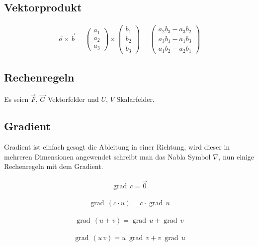 \documentclass[a4paper]{scrartcl}
\begin{document}
\subsection{Vektorprodukt}
\begin{align}
 \vec{a}\times\vec{b} = \begin{pmatrix}a_1 \\ a_2 \\ a_3\end{pmatrix} \times
\begin{pmatrix}b_1 \\ b_2 \\ b_3 \end{pmatrix} = \begin{pmatrix} a_2b_3 - a_3b_2
\\ a_3b_1 - a_1b_3 \\ a_1b_2 - a_2b_1 \end{pmatrix}
\end{align}

\subsection{Rechenregeln}
Es seien $\vec F$, $\vec G$ Vektorfelder und $U$, $V$ Skalarfelder.


\subsection{Gradient}

Gradient ist einfach gesagt die Ableitung in einer Richtung, wird dieser in mehreren Dimensionen angewendet schreibt man das Nabla Symbol $ \nabla $, nun einige Rechenregeln mit dem Gradient.

\begin{align}
\operatorname{grad}\,c=\vec{0}
\end{align}

\begin{align}
\operatorname{grad}\,(c\cdot u)=c\cdot\operatorname{grad}\,u
\end{align}

\begin{align}
\operatorname{grad}\,(u+v)=\operatorname{grad}\,u+\operatorname{grad}\,v
\end{align}

\begin{align}
\operatorname{grad}\,(u\, v) = u\ \operatorname{grad}\,v + v\ \operatorname{grad}\,u
\end{align}
\end{document}
